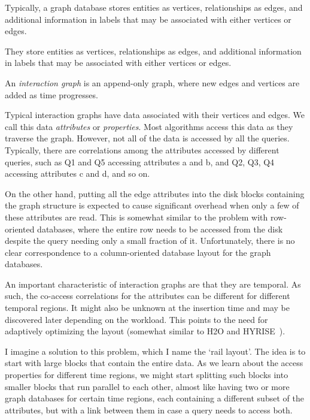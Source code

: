 Typically, a graph database stores entities as vertices,
relationships as edges, and additional information in labels that may be
associated with either vertices or edges.




They store entities as vertices,
relationships as edges, and additional information in labels that may be
associated with either vertices or edges. 


An \emph{interaction graph} is an append-only graph, where new edges and
vertices are added as time progresses.%

Typical interaction graphs have data associated with their vertices and edges.
We call this data \emph{attributes} or \emph{properties}. Most algorithms
access this data as they traverse the graph. However, not all of the data is
accessed by all the queries. Typically, there are correlations among the
attributes accessed by different queries, such as Q1 and Q5 accessing
attributes a and b, and Q2, Q3, Q4 accessing attributes c and d, and so on.%


On the other hand, putting all the edge attributes into the disk blocks
containing the graph structure is expected to cause significant overhead when
only a few of these attributes are read. This is somewhat similar to the 
problem with row-oriented databases, where the entire row needs to be accessed
from the disk despite the query needing only a small fraction of it.
Unfortunately, there is no clear correspondence to a column-oriented database
layout for the graph databases.%

An important characteristic of interaction graphs are that they are temporal.
As such, the co-access correlations for the attributes can be different for
different temporal regions. It might also be unknown at the insertion time and
may be discovered later depending on the workload. This points to the need for
adaptively optimizing the layout (somewhat similar to H2O \cite{alagiannis14}
and HYRISE~\cite{grund10}).%

I imagine a solution to this problem, which I name the `rail layout'. The idea
is to start with large blocks that contain the entire data. As we learn about
the access properties for different time regions, we might start splitting
such blocks into smaller blocks that run parallel to each other, almost like
having two or more graph databases for certain time regions, each containing a
 different subset of the attributes, but with a link between them in case a
query needs to access both.